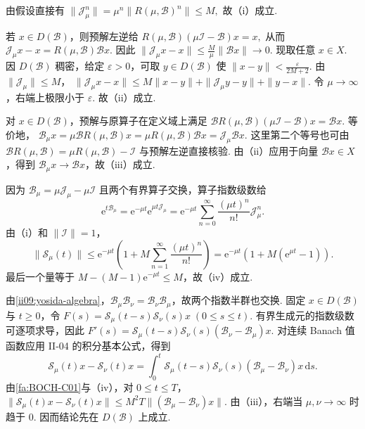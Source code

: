 \begin{FAProof}
由假设直接有 \(\displaystyle \|\mathcal J_\mu^n\| = \mu^n\|R(\mu,\mathcal B)^n\| \leqslant M,\)
故（i）成立.

若 \(\displaystyle x\in D(\mathcal B)\)，则预解左逆给 \(\displaystyle R(\mu,\mathcal B)(\mu\mathcal I-\mathcal B)x=x,\)
从而 \(\displaystyle \mathcal J_\mu x-x = R(\mu,\mathcal B)\mathcal Bx.\)
因此 \(\displaystyle \|\mathcal J_\mu x-x\| \leqslant \frac{M}{\mu}\|\mathcal Bx\| \longrightarrow0.\)
现取任意 \(\displaystyle x\in X\). 因 \(\displaystyle D(\mathcal B)\) 稠密，给定 \(\displaystyle\varepsilon>0\)，可取 \(\displaystyle y\in D(\mathcal B)\) 使 \(\displaystyle\|x-y\|<\frac{\varepsilon}{2M+2}\). 由 \(\displaystyle\|\mathcal J_\mu\|\leqslant M\)， \(\displaystyle \|\mathcal J_\mu x-x\| \leqslant M\|x-y\|+\|\mathcal J_\mu y-y\|+\|y-x\|.\)
令 \(\displaystyle\mu\to\infty\)，右端上极限小于 \(\displaystyle\varepsilon\). 故（ii）成立.

对 \(\displaystyle x\in D(\mathcal B)\)，预解与原算子在定义域上满足 \(\displaystyle \mathcal B R(\mu,\mathcal B)(\mu\mathcal I-\mathcal B)x = \mathcal Bx.\)
等价地， \(\displaystyle \mathcal B_\mu x = \mu\mathcal B R(\mu,\mathcal B)x = \mu R(\mu,\mathcal B)\mathcal Bx = \mathcal J_\mu\mathcal Bx.\)
这里第二个等号也可由 \(\displaystyle\mathcal B R(\mu,\mathcal B)=\mu R(\mu,\mathcal B)-\mathcal I\) 与预解左逆直接核验. 由（ii）应用于向量 \(\displaystyle\mathcal Bx\in X\)，得到 \(\displaystyle\mathcal B_\mu x\to\mathcal Bx\)，故（iii）成立.

因为 \(\displaystyle\mathcal B_\mu=\mu\mathcal J_\mu-\mu\mathcal I\) 且两个有界算子交换，算子指数级数给
\[
\mathrm{e}^{t\mathcal B_\mu}
=
\mathrm{e}^{-\mu t}\mathrm{e}^{\mu t\mathcal J_\mu}
=
\mathrm{e}^{-\mu t}
\sum_{n=0}^{\infty}
\frac{(\mu t)^n}{n!}\mathcal J_\mu^n.
\]
由（i）和 \(\displaystyle\|\mathcal I\|=1\)，
\[
\|\mathcal S_\mu(t)\|
\leqslant
\mathrm{e}^{-\mu t}
\left(
1+M\sum_{n=1}^{\infty}\frac{(\mu t)^n}{n!}
\right)
=
\mathrm{e}^{-\mu t}\left(1+M(\mathrm{e}^{\mu t}-1)\right).
\]
最后一个量等于 \(\displaystyle M-(M-1)\mathrm{e}^{-\mu t}\leqslant M\)，故（iv）成立.

由\autoref{ii09:yosida-algebra}，\(\displaystyle\mathcal B_\mu\mathcal B_\nu=\mathcal B_\nu\mathcal B_\mu\)，故两个指数半群也交换. 固定 \(\displaystyle x\in D(\mathcal B)\) 与 \(\displaystyle t\geqslant0\)，令 \(\displaystyle F(s)=\mathcal S_\mu(t-s)\mathcal S_\nu(s)x \; (0\leqslant s\leqslant t).\)
有界生成元的指数级数可逐项求导，因此 \(\displaystyle F'(s) = \mathcal S_\mu(t-s)\mathcal S_\nu(s) (\mathcal B_\nu-\mathcal B_\mu)x.\)
对连续 Banach 值函数应用 II-04 的积分基本公式，得到
\[
\mathcal S_\mu(t)x-\mathcal S_\nu(t)x
=
\int_0^t
\mathcal S_\mu(t-s)\mathcal S_\nu(s)
(\mathcal B_\mu-\mathcal B_\nu)x
\,\mathrm{d}s.
\]
由\autoref{fa:BOCH-C01}与（iv），对 \(\displaystyle0\leqslant t\leqslant T\)， \(\displaystyle \|\mathcal S_\mu(t)x-\mathcal S_\nu(t)x\| \leqslant M^2T\|(\mathcal B_\mu-\mathcal B_\nu)x\|.\)
由（iii），右端当 \(\displaystyle\mu,\nu\to\infty\) 时趋于 \(\displaystyle0\). 因而结论先在 \(\displaystyle D(\mathcal B)\) 上成立.


\end{FAProof}
